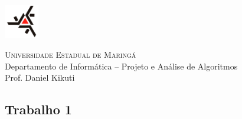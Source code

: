 \documentclass[a4paper]{exam}
\begin{document}
\printanswers

\begin{center}
\begin{minipage}[c][1.5cm][c]{1.5cm}
\includegraphics[height=1.5cm]{logo.jpg}
\end{minipage}
\begin{minipage}[c][1.5cm][c]{12cm} 
\textsc{\Large Universidade Estadual de Maringá} \\
Departamento de Informática -- Projeto e Análise de Algoritmos \\
Prof. Daniel Kikuti
\end{minipage}
\end{center}

\begin{center}
\section*{Trabalho 1}
\end{center}

\bracketedpoints
\pointname{}
\end{document}
